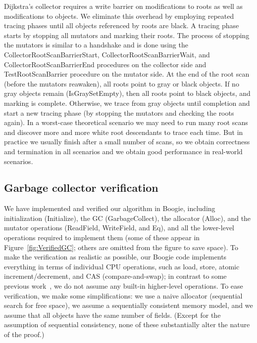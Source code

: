 Dijkstra's collector requires a write barrier on modifications to roots as well as modifications to objects. 
We eliminate this overhead by employing repeated tracing 
phases until all objects referenced by roots are black. 
A tracing phase starts by stopping all mutators and marking their roots. 
The process of stopping the mutators is similar to a handshake and is done using the CollectorRootScanBarrierStart, CollectorRootScanBarrierWait, and CollectorRootScanBarrierEnd procedures on the collector side and TestRootScanBarrier procedure on the mutator side. 
At the end of the root scan (before the mutators reawaken), all roots point to gray or black objects.
If no gray objects remain (IsGraySetEmpty), then all roots point to black objects, and marking is complete. 
Otherwise, we trace from gray objects until completion and start a new
tracing phase (by stopping the mutators and checking the roots again). 
In a worst-case theoretical scenario we may need to run many root scans and discover more and more white root descendants to trace each time. 
But in practice we usually finish after a small number of scans,
so we obtain correctness and termination in all scenarios and we obtain good performance in real-world scenarios. 

\subsection{Garbage collector verification}
\label{sec:gc-verify}

We have implemented and verified our algorithm in Boogie,
including initialization (Initialize), the GC (GarbageCollect), the allocator (Alloc),
and the mutator operations (ReadField, WriteField, and Eq),
and all the lower-level operations required to implement them (some of these appear
in Figure~\ref{fig:VerifiedGC}; others are omitted from the figure to save space).
To make the verification as realistic as possible,
our Boogie code implements everything in terms of individual CPU operations,
such as load, store, atomic increment/decrement, and CAS (compare-and-swap);
in contrast to some previous work~\cite{gont96},
we do not assume any built-in higher-level operations.
To ease verification, we make some simplifications:
we use a naive allocator (sequential search for free space),
we assume a sequentially consistent memory model,
and we assume that all objects have the same number of fields.
(Except for the assumption of sequential consistency, none of these substantially alter the nature of the proof.)

